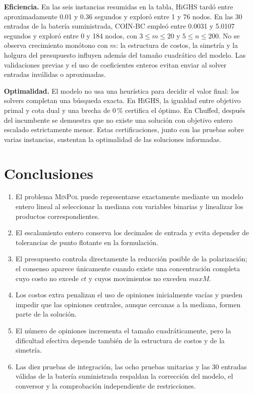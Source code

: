 \documentclass[11pt,letterpaper]{article}
\newcommand{\MinPol}{{\normalfont\scshape MinPol}}
\begin{document}
\textbf{Eficiencia.} En las seis instancias resumidas en la tabla, HiGHS
tardó entre aproximadamente 0.01 y 0.36 segundos y exploró entre 1 y 76
nodos. En las 30 entradas de la batería suministrada, COIN-BC empleó entre
0.0031 y 5.0107 segundos y exploró entre 0 y 184 nodos, con
\(3\le m\le20\) y \(5\le n\le200\). No se
observa crecimiento
monótono con \(m\): la estructura de costos, la simetría y la holgura del
presupuesto influyen además del tamaño cuadrático del modelo. Las
validaciones previas y el uso de coeficientes enteros evitan enviar al solver
entradas inválidas o aproximadas.

\textbf{Optimalidad.} El modelo no usa una heurística para decidir el valor
final: los solvers completan una búsqueda exacta. En HiGHS, la igualdad entre
objetivo primal y cota dual y una brecha de 0\,\% certifica el óptimo. En
Chuffed, después del incumbente se demuestra que no existe una solución con
objetivo entero escalado estrictamente menor. Estas certificaciones, junto
con las pruebas sobre varias instancias, sustentan la optimalidad de las
soluciones informadas.

\section{Conclusiones}

\begin{enumerate}
    \item El problema \MinPol{} puede representarse exactamente mediante un
    modelo entero lineal al seleccionar la mediana con variables binarias y
    linealizar los productos correspondientes.
    \item El escalamiento entero conserva los decimales de entrada y evita
    depender de tolerancias de punto flotante en la formulación.
    \item El presupuesto controla directamente la reducción posible de la
    polarización; el consenso aparece únicamente cuando existe una
    concentración completa cuyo costo no excede \(ct\) y cuyos movimientos
    no exceden \(maxM\).
    \item Los costos extra penalizan el uso de opiniones inicialmente vacías
    y pueden impedir que las opiniones centrales, aunque cercanas a la
    mediana, formen parte de la solución.
    \item El número de opiniones incrementa el tamaño cuadráticamente, pero
    la dificultad efectiva depende también de la estructura de costos y de
    la simetría.
    \item Las diez pruebas de integración, las ocho pruebas unitarias y las 30
    entradas válidas de la batería suministrada respaldan la corrección del
    modelo, el conversor y la comprobación independiente de restricciones.
\end{enumerate}
\end{document}
